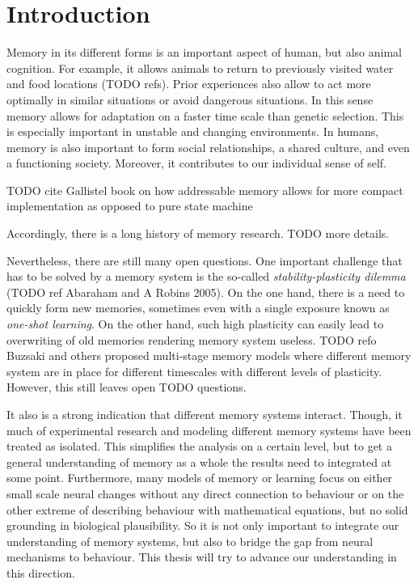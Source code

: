 \chapter{Introduction}

Memory in its different forms is an important aspect of human, but also animal cognition.
For example, it allows animals to return to previously visited water and food locations (TODO refs).
Prior experiences also allow to act more optimally in similar situations or avoid dangerous situations.
In this sense memory allows for adaptation on a faster time scale than genetic selection.
This is especially important in unstable and changing environments.
In humans, memory is also important to form social relationships, a shared culture, and even a functioning society.
Moreover, it contributes to our individual sense of self.

TODO cite Gallistel book on how addressable memory allows for more compact implementation as opposed to pure state machine

Accordingly, there is a long history of memory research.
TODO more details.

Nevertheless, there are still many open questions.
One important challenge that has to be solved by a memory system is the so-called \emph{stability-plasticity dilemma} (TODO ref Abaraham and A Robins 2005).
On the one hand, there is a need to quickly form new memories, sometimes even with a single exposure known as \emph{one-shot learning}.
On the other hand, such high plasticity can easily lead to overwriting of old memories rendering memory system useless.
TODO refo Buzsaki and others proposed multi-stage memory models where different memory system are in place for different timescales with different levels of plasticity.
However, this still leaves open TODO questions.

It also is a strong indication that different memory systems interact.
Though, it much of experimental research and modeling different memory systems have been treated as isolated.
This simplifies the analysis on a certain level, but to get a general understanding of memory as a whole the results need to integrated at some point.
Furthermore, many models of memory or learning focus on either small scale neural changes without any direct connection to behaviour or on the other extreme of describing behaviour with mathematical equations, but no solid grounding in biological plausibility.
So it is not only important to integrate our understanding of memory systems, but also to bridge the gap from neural mechanisms to behaviour.
This thesis will try to advance our understanding in this direction.

